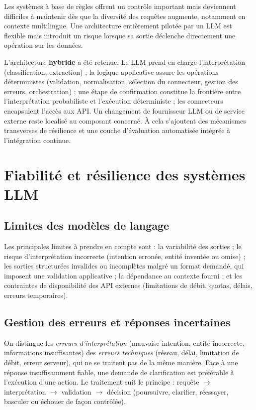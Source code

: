 \documentclass[11pt,a4paper,openany,oneside]{report}
\begin{document}
Les systèmes à base de règles offrent un contrôle important mais deviennent difficiles à maintenir dès que la diversité des requêtes augmente, notamment en contexte multilingue. Une architecture entièrement pilotée par un LLM est flexible mais introduit un risque lorsque sa sortie déclenche directement une opération sur les données.

L'architecture \textbf{hybride} a été retenue. Le LLM prend en charge l'interprétation (classification, extraction) ; la logique applicative assure les opérations déterministes (validation, normalisation, sélection du connecteur, gestion des erreurs, orchestration) ; une étape de confirmation constitue la frontière entre l'interprétation probabiliste et l'exécution déterministe ; les connecteurs encapsulent l'accès aux API. Un changement de fournisseur LLM ou de service externe reste localisé au composant concerné. À cela s'ajoutent des mécanismes transverses de résilience et une couche d'évaluation automatisée intégrée à l'intégration continue.

\section{Fiabilité et résilience des systèmes LLM}
\subsection{Limites des modèles de langage}
Les principales limites à prendre en compte sont : la variabilité des sorties ; le risque d'interprétation incorrecte (intention erronée, entité inventée ou omise) ; les sorties structurées invalides ou incomplètes malgré un format demandé, qui imposent une validation applicative ; la dépendance au contexte fourni ; et les contraintes de disponibilité des API externes (limitations de débit, quotas, délais, erreurs temporaires).

\subsection{Gestion des erreurs et réponses incertaines}
On distingue les \emph{erreurs d'interprétation} (mauvaise intention, entité incorrecte, informations insuffisantes) des \emph{erreurs techniques} (réseau, délai, limitation de débit, erreur serveur), qui ne se traitent pas de la même manière. Face à une réponse insuffisamment fiable, une demande de clarification est préférable à l'exécution d'une action. Le traitement suit le principe : requête $\rightarrow$ interprétation $\rightarrow$ validation $\rightarrow$ décision (poursuivre, clarifier, réessayer, basculer ou échouer de façon contrôlée).
\end{document}

